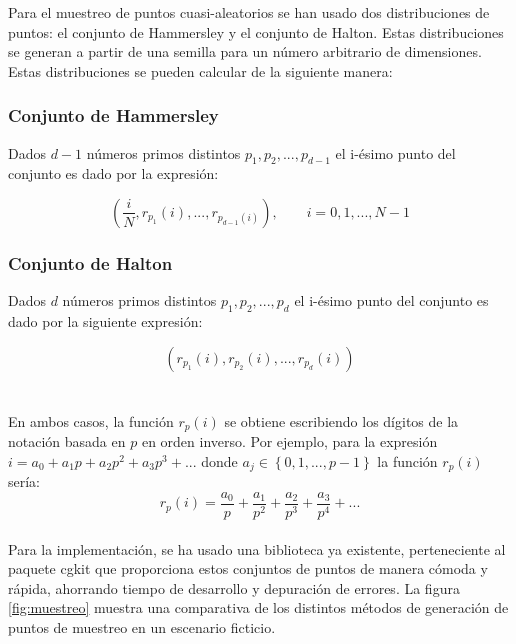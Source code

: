 Para el muestreo de puntos cuasi-aleatorios se han usado dos distribuciones de puntos: el conjunto de Hammersley y el conjunto de Halton. Estas distribuciones se generan a partir de una semilla para un número arbitrario de dimensiones. Estas distribuciones se pueden calcular de la siguiente manera:

\subsubsection{Conjunto de Hammersley}

Dados $d-1$ números primos distintos $p_1, p_2, ... , p_{d-1}$ el i-ésimo punto del conjunto es dado por la expresión:

\[ \left( \frac{i}{N}, r_{p_1}(i), ..., r_{p_{d-1}(i)} \right), \qquad i = 0, 1, ..., N-1\]

\subsubsection{Conjunto de Halton}

Dados $d$ números primos distintos $p_1, p_2, ..., p_d$ el i-ésimo punto del conjunto es dado por la siguiente expresión:

\[ \left( r_{p_1}(i),  r_{p_2}(i), ...,  r_{p_d}(i) \right) \]\\~\\

En ambos casos, la función $r_p(i)$ se obtiene  escribiendo los dígitos de la notación basada en $p$ en orden inverso. Por ejemplo, para la expresión $i = a_0 + a_1 p + a_2 p^2 + a_3 p^3 + ... $ donde $a_j \in \left\lbrace 0, 1, ... , p-1 \right\rbrace$ la función $r_p(i)$ sería:\\

\[ r_p(i) = \frac{a_0}{p} + \frac{a_1}{p^2} + \frac{a_2}{p^3} + \frac{a_3}{p^4} + ...\]\\

Para la implementación, se ha usado una biblioteca ya existente, perteneciente al paquete cgkit que proporciona estos conjuntos de puntos de manera cómoda y rápida, ahorrando tiempo de desarrollo y depuración de errores. La figura \ref{fig:muestreo} muestra una comparativa de los distintos métodos de generación de puntos de muestreo en un escenario ficticio.\\

